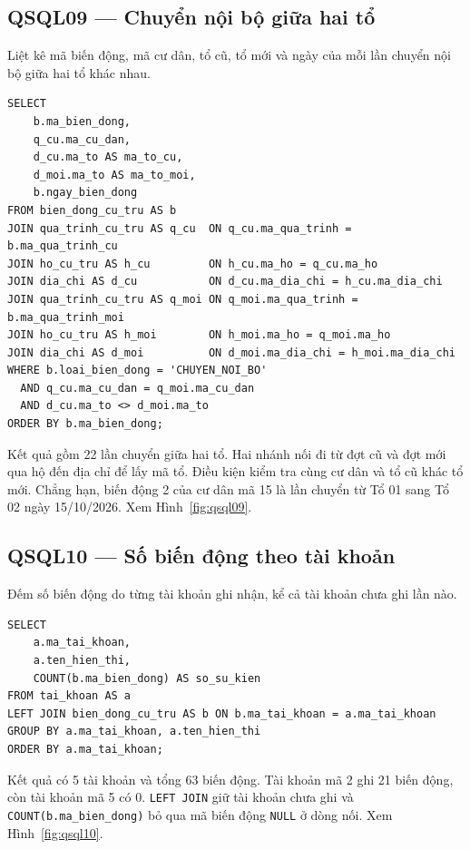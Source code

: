 \noindent\begin{minipage}{\linewidth}
\subsection*{QSQL09 --- Chuyển nội bộ giữa hai tổ}

Liệt kê mã biến động, mã cư dân, tổ cũ, tổ mới và ngày của mỗi lần chuyển nội bộ giữa hai tổ khác nhau.

\begin{lstlisting}[style=sqlvn]
SELECT
    b.ma_bien_dong,
    q_cu.ma_cu_dan,
    d_cu.ma_to AS ma_to_cu,
    d_moi.ma_to AS ma_to_moi,
    b.ngay_bien_dong
FROM bien_dong_cu_tru AS b
JOIN qua_trinh_cu_tru AS q_cu  ON q_cu.ma_qua_trinh = b.ma_qua_trinh_cu
JOIN ho_cu_tru AS h_cu         ON h_cu.ma_ho = q_cu.ma_ho
JOIN dia_chi AS d_cu           ON d_cu.ma_dia_chi = h_cu.ma_dia_chi
JOIN qua_trinh_cu_tru AS q_moi ON q_moi.ma_qua_trinh = b.ma_qua_trinh_moi
JOIN ho_cu_tru AS h_moi        ON h_moi.ma_ho = q_moi.ma_ho
JOIN dia_chi AS d_moi          ON d_moi.ma_dia_chi = h_moi.ma_dia_chi
WHERE b.loai_bien_dong = 'CHUYEN_NOI_BO'
  AND q_cu.ma_cu_dan = q_moi.ma_cu_dan
  AND d_cu.ma_to <> d_moi.ma_to
ORDER BY b.ma_bien_dong;
\end{lstlisting}

Kết quả gồm 22 lần chuyển giữa hai tổ. Hai nhánh nối đi từ đợt cũ và đợt mới qua hộ đến địa chỉ để lấy mã tổ. Điều kiện kiểm tra cùng cư dân và tổ cũ khác tổ mới. Chẳng hạn, biến động 2 của cư dân mã 15 là lần chuyển từ Tổ 01 sang Tổ 02 ngày 15/10/2026. Xem Hình~\ref{fig:qsql09}.
\end{minipage}\par\medskip

\noindent\begin{minipage}{\linewidth}
\subsection*{QSQL10 --- Số biến động theo tài khoản}

Đếm số biến động do từng tài khoản ghi nhận, kể cả tài khoản chưa ghi lần nào.

\begin{lstlisting}[style=sqlvn]
SELECT
    a.ma_tai_khoan,
    a.ten_hien_thi,
    COUNT(b.ma_bien_dong) AS so_su_kien
FROM tai_khoan AS a
LEFT JOIN bien_dong_cu_tru AS b ON b.ma_tai_khoan = a.ma_tai_khoan
GROUP BY a.ma_tai_khoan, a.ten_hien_thi
ORDER BY a.ma_tai_khoan;
\end{lstlisting}

Kết quả có 5 tài khoản và tổng 63 biến động. Tài khoản mã 2 ghi 21 biến động, còn tài khoản mã 5 có 0. \texttt{LEFT JOIN} giữ tài khoản chưa ghi và \texttt{COUNT(b.ma\_bien\_dong)} bỏ qua mã biến động \texttt{NULL} ở dòng nối. Xem Hình~\ref{fig:qsql10}.
\end{minipage}\par\medskip

